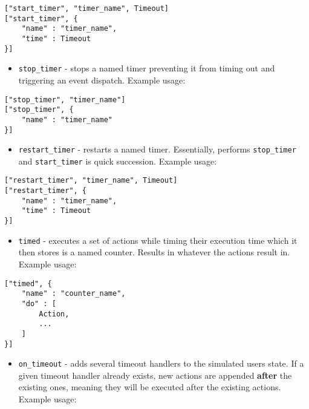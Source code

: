 \documentclass[a4paper]{article}
\begin{document}
\begin{verbatim}
["start_timer", "timer_name", Timeout]
["start_timer", {
    "name" : "timer_name",
    "time" : Timeout
}]
\end{verbatim}





\begin{itemize}
\item \texttt{stop\_timer} - stops a named timer preventing it from timing out and triggering an event dispatch. Example usage:
\end{itemize}

\begin{verbatim}
["stop_timer", "timer_name"]
["stop_timer", {
    "name" : "timer_name"
}]
\end{verbatim}





\begin{itemize}
\item \texttt{restart\_timer} - restarts a named timer. Essentially, performs \texttt{stop\_timer} and \texttt{start\_timer} is quick succession. Example usage:
\end{itemize}

\begin{verbatim}
["restart_timer", "timer_name", Timeout]
["restart_timer", {
    "name" : "timer_name",
    "time" : Timeout
}]
\end{verbatim}





\begin{itemize}
\item \texttt{timed} - executes a set of actions while timing their execution time which it then stores is a named counter. Results in whatever the actions result in. Example usage:
\end{itemize}

\begin{verbatim}
["timed", {
    "name" : "counter_name",
    "do" : [
        Action,
        ...
    ]
}]
\end{verbatim}





\begin{itemize}
\item \texttt{on\_timeout} - adds several timeout handlers to the simulated users state. If a given timeout handler already exists, new actions are appended \textbf{after} the existing ones, meaning they will be executed after the existing actions. Example usage:
\end{itemize}
\end{document}
